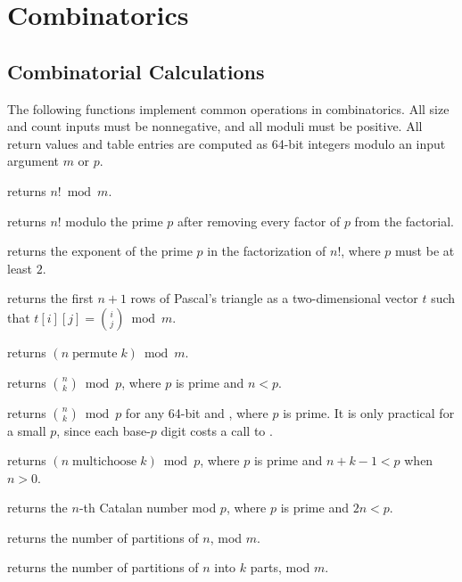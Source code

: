 \section{\texorpdfstring{Combinatorics}{6.2 Combinatorics}}
\setcounter{section}{2}
\setcounter{subsection}{0}
\subsection{Combinatorial Calculations}
\label{sec:6.2.1}
The following functions implement common operations in combinatorics. All size and count inputs must be nonnegative, and all moduli must be positive. All return values and table entries are computed as 64-bit integers modulo an input argument $m$ or $p$.

\begin{compactitem}
  \item {} returns $n! \bmod m$.
  \item {} returns $n!$ modulo the prime $p$ after removing every factor of $p$ from the factorial.
  \item {} returns the exponent of the prime $p$ in the factorization of $n!$, where $p$ must be at least $2$.
  \item {} returns the first $n + 1$ rows of Pascal's triangle as a two-dimensional vector $t$ such that $t[i][j] = \binom{i}{j} \bmod m$.
  \item {} returns $(n \mathbin{\text{permute}} k) \bmod m$.
  \item {} returns $\binom{n}{k} \bmod p$, where $p$ is prime and $n < p$.
  \item {} returns $\binom{n}{k} \bmod p$ for any 64-bit  and , where $p$ is prime. It is only practical for a small $p$, since each base-$p$ digit costs a call to .
  \item {} returns $(n \mathbin{\text{multichoose}} k) \bmod p$, where $p$ is prime and $n + k - 1 < p$ when $n > 0$.
  \item {} returns the $n$-th Catalan number mod $p$, where $p$ is prime and $2n < p$.
  \item {} returns the number of partitions of $n$, mod $m$.
  \item {} returns the number of partitions of $n$ into $k$ parts, mod $m$.

\end{compactitem}
